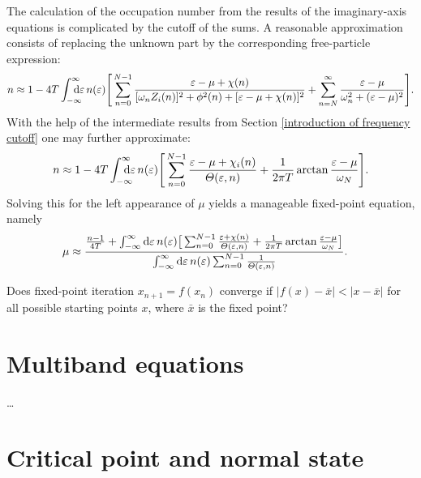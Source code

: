 The calculation of the occupation number from the results of the imaginary-axis
 equations is complicated by the cutoff of the 
sums. A reasonable approximation consists of replacing the unknown part by the
corresponding free-particle expression:
%
\begin{equation*}
    n \approx 1 - 4 T \int \from{-\infty} \till \infty \D \epsilon \,
    n(\epsilon)
    \Bigg[
        \sum_{n = 0}^{N - 1} \frac
            {\epsilon - \mu + \chi(n)}
            {[\omega_n Z_i(n)]^2 + \phi^2(n) + [\epsilon - \mu + \chi(n)]^2}
        + \sum_{n = N}^\infty \frac
            {\epsilon - \mu}
            {\omega_n^2 + (\epsilon - \mu)^2}
    \Bigg].
\end{equation*}
%
With the help of the intermediate results from Section \ref{introduction of frequency cutoff} one may further approximate:
%
\begin{equation*}
    n \approx 1 - 4 T \int \from{-\infty} \till \infty \D \epsilon \,
    n(\epsilon)
    \Bigg[
        \sum_{n = 0}^{N - 1}
        \frac{\epsilon - \mu + \chi_i(n)}{\Theta(\epsilon, n)}
        + \frac 1 {2 \pi T} \arctan \frac{\epsilon - \mu}{\omega_N}
    \Bigg].
\end{equation*}
%
Solving this for the left appearance of $\mu$ yields a manageable fixed-point
equation, namely
%
\begin{align*}
    \mu &\approx \frac
    {
        \frac{n - 1}{4 T} + \int_{-\infty}^\infty \mathrm d \varepsilon \, n(\varepsilon)
        \big[
            \sum_{n = 0}^{N - 1} \frac{\varepsilon + \chi(n)}{\varTheta(\varepsilon, n)}
            + \frac 1 {2 \pi T} \arctan \frac{\varepsilon - \mu}{\omega_N}
        \big]
    }
    {
        \int_{-\infty}^\infty \mathrm d \varepsilon \, n(\varepsilon)
        \sum_{n = 0}^{N - 1} \frac 1 {\varTheta(\varepsilon, n)}
    }.
\end{align*}

Does fixed-point iteration $x_{n + 1} = f(x_n)$ converge if $|f(x) - \bar x| <
|x - \bar x|$ for all possible starting points $x$, where $\bar x$ is the fixed
point?

\section{Multiband  equations}

\dots

\section{Critical point and normal state}

